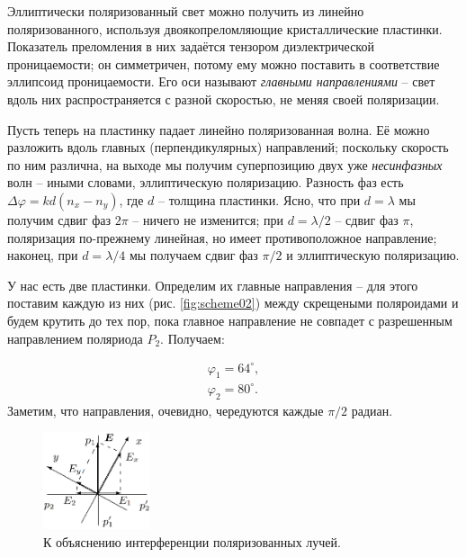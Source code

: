 \documentclass{../lab_class}
\begin{document}
Эллиптически поляризованный свет можно получить из линейно поляризованного, используя двоякопреломляющие кристаллические пластинки. Показатель преломления в них задаётся тензором диэлектрической проницаемости; он симметричен, потому ему можно поставить в соответствие эллипсоид проницаемости. Его оси называют \emph{главными направлениями} -- свет вдоль них распространяется с разной скоростью, не меняя своей поляризации.

Пусть теперь на пластинку падает линейно поляризованная волна. Её можно разложить вдоль главных (перпендикулярных) направлений; поскольку скорость по ним различна, на выходе мы получим суперпозицию двух уже \emph{несинфазных} волн -- иными словами, эллиптическую поляризацию. Разность фаз есть $\Delta \varphi = k d (n_x - n_y)$, где $d$ -- толщина пластинки. Ясно, что при $d = \lambda$ мы получим сдвиг фаз $2 \pi$ -- ничего не изменится; при $d = \lambda / 2$ -- сдвиг фаз $\pi$, поляризация по-прежнему линейная, но имеет противоположное направление; наконец, при $d = \lambda / 4$ мы получаем сдвиг фаз $\pi/2$ и эллиптическую поляризацию.

У нас есть две пластинки. Определим их главные направления -- для этого поставим каждую из них (рис. \ref{fig:scheme02}) между скрещеными поляроидами и будем крутить до тех пор, пока главное направление не совпадет с разрешенным направлением поляриода $P_2$. Получаем:

\begin{gather*}
	\varphi_1 = 64^{\circ}, \\
	\varphi_2 = 80^{\circ}.
\end{gather*}
Заметим, что направления, очевидно, чередуются каждые $\pi/2$ радиан.

\begin{figure}
  \vspace{-20pt}
  \begin{center}
    \includegraphics[width=0.28\textwidth]{03.png}
  \end{center}
  \vspace{-20pt}
  \caption{К объяснению интерференции поляризованных лучей.}
  \label{fig:scheme03}
  \vspace{-10pt}
\end{figure}
\end{document}
